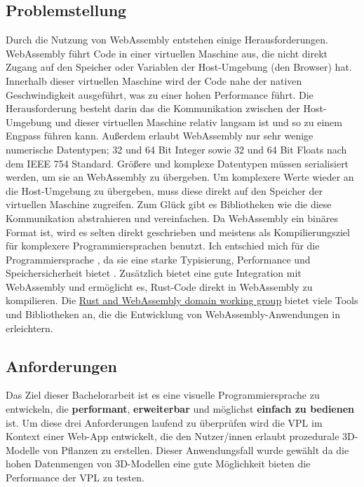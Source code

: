 \documentclass[ngerman]{article}
\begin{document}
\pagebreak

\subsection{Problemstellung}

Durch die Nutzung von WebAssembly entstehen einige Herausforderungen. 
WebAssembly führt Code in einer virtuellen Maschine aus, die nicht direkt Zugang auf den Speicher oder Variablen der Host-Umgebung (den Browser) hat.
Innerhalb dieser virtuellen Maschine wird der Code nahe der nativen Geschwindigkeit ausgeführt, was zu einer hohen Performance führt. 
Die Herausforderung besteht darin das die Kommunikation zwischen der Host-Umgebung und dieser virtuellen Maschine relativ langsam ist und so zu einem Engpass führen kann.
\br
Außerdem erlaubt WebAssembly nur sehr wenige numerische Datentypen; 32 und 64 Bit Integer sowie 32 und 64 Bit Floats nach dem IEEE 754 Standard. 
Größere und komplexe Datentypen müssen serialisiert werden, um sie an WebAssembly zu übergeben. 
Um komplexere Werte wieder an die Host-Umgebung zu übergeben, muss diese direkt auf den Speicher der virtuellen Maschine zugreifen.
Zum Glück gibt es Bibliotheken wie  die diese Kommunikation abstrahieren und vereinfachen.
\br
Da WebAssembly ein binäres Format ist, wird es selten direkt geschrieben und meistens als Kompilierungsziel für komplexere Programmiersprachen benutzt.
Ich entschied mich für die Programmiersprache , da sie eine starke Typisierung, Performance und Speichersicherheit bietet \cite{bugden2022rust}.
Zusätzlich bietet  eine gute Integration mit WebAssembly und ermöglicht es, Rust-Code direkt in WebAssembly zu kompilieren. 
Die \href{https://rustwasm.github.io/}{Rust and WebAssembly domain working group} bietet viele Tools und Bibliotheken an, die die Entwicklung von WebAssembly-Anwendungen in  erleichtern.

\subsection{Anforderungen} 
\label{sec:Anforderungen}

Das Ziel dieser Bachelorarbeit ist es eine visuelle Programmiersprache zu entwickeln, die \textbf{performant}, \textbf{erweiterbar} und möglichst \textbf{einfach zu bedienen} ist.
Um diese drei Anforderungen laufend zu überprüfen wird die VPL im Kontext einer Web-App entwickelt, die den Nutzer/innen erlaubt prozedurale 3D-Modelle von Pflanzen zu erstellen.
Dieser Anwendungsfall wurde gewählt da die hohen Datenmengen von 3D-Modellen eine gute Möglichkeit bieten die Performance der VPL zu testen.
\end{document}
